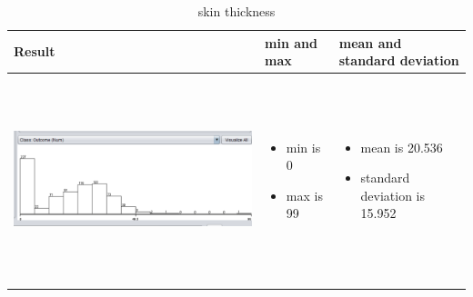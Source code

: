 \documentclass{article}
\begin{document}
\begin{table}[h!]
  \centering
  \begin{tabular}{ | m{5 cm} | m{3cm} | m{3cm} | }
    \hline
   Result &  min and max & mean and standard deviation \\ \hline
    \begin{minipage}{.3\textwidth}
      \includegraphics[width=\linewidth, height=60mm]{skin thickness.png}
    \end{minipage}
    &
      \begin{itemize}
        \item  min is 0
        \item max is 99
          
      \end{itemize}
    & 
      \begin{itemize}
        \item  mean is 20.536
        \item  standard deviation is 15.952 
          
      \end{itemize}
    \\ \hline
  \end{tabular}
  \caption{ skin thickness }\label{tbl:myLboro}
\end{table}
\end{document}
